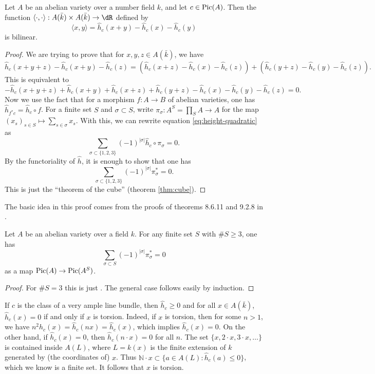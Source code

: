 \begin{lemma}\label{lem:height-quadratic}
Let $A$ be an abelian variety over a number field $k$, and let $c\in \operatorname{Pic}(A)$. 
Then the function 
$\langle \cdot,\cdot\rangle:A(\bar k)\times A(\bar k)\to \dR$ defined by 
\[
  \langle x,y\rangle = \widehat h_c(x+y)-\widehat h_c(x)-\widehat h_c(y)
\]
is bilinear. 
\end{lemma}
\begin{proof}
We are trying to prove that for $x,y,z\in A(\bar k)$, we have 
\[
  \widehat h_c(x+y+z)-\widehat h_c(x+y)-\widehat h_c(z) = \left(\widehat h_c(x+z)-\widehat h_c(x)-\widehat h_c(z)\right) + \left(\widehat h_c(y+z)-\widehat h_c(y)-\widehat h_c(z)\right) \text{.}
\]
This is equivalent to 
\begin{equation}\label{eq:height-quadratic}
  -\widehat h_c(x+y+z)+\widehat h_c(x+y)+\widehat h_c(x+z)+\widehat h_c(y+z)-\widehat h_c(x)-\widehat h_c(y)-\widehat h_c(z) = 0 \text{.}
\end{equation}
Now we use the fact that for a morphism $f:A\to B$ of abelian varieties, one has 
$\widehat h_{f^\ast c}=\widehat h_c\circ f$. For a finite set $S$ and 
$\sigma\subset S$, write $\pi_\sigma:A^S=\prod_S A\to A$ for the map 
$(x_s)_{s\in S}\mapsto \sum_{s\in\sigma} x_s$. With this, we can rewrite 
equation \eqref{eq:height-quadratic} as 
\[
  \sum_{\sigma\subset \{1,2,3\}} (-1)^{|\sigma|}\widehat h_c\circ \pi_\sigma = 0 \text{.}
\]
By the functoriality of $\widehat h$, it is enough to show that one has 
\[
  \sum_{\sigma\subset \{1,2,3\}} (-1)^{|\sigma|} \pi_\sigma^\ast = 0 \text{.}
\]
This is just the ``theorem of the cube'' (theorem \ref{thm:cube}). 
\end{proof}

The basic idea in this proof comes from the proofs of theorems 8.6.11 and 
9.2.8 in \cite{bg06}. 

\begin{theorem}\label{thm:cube}
Let $A$ be an abelian variety over a field $k$. For any finite set $S$ with 
$\# S\geqslant 3$, one has 
\[
  \sum_{\sigma\subset S} (-1)^{|\sigma|} \pi_\sigma^\ast = 0
\]
as a map $\operatorname{Pic}(A)\to \operatorname{Pic}(A^S)$. 
\end{theorem}
\begin{proof}
For $\# S=3$ this is just \cite[2.7]{gm13}. %
The general case follows easily by induction. 
\end{proof}



If $c$ is the class of a very ample line bundle, then 
$\widehat h_c\geqslant 0$ and for all $x\in A(\bar k)$, 
$\widehat h_c(x)=0$ if and only if $x$ is torsion. 
Indeed, if $x$ is torsion, then for some $n>1$, we have 
$n^2 \widehat h_c(x)=\widehat h_c(n x)=\widehat h_c(x)$, which implies 
$\widehat h_c(x)=0$. On the other hand, if $\widehat h_c(x)=0$, then 
$\widehat h_c(n\cdot x)=0$ for all $n$. The set 
$\{x,2\cdot x,3\cdot x,\dots\}$ is contained inside $A(L)$, where $L=k(x)$ is 
the finite extension of $k$ generated by (the coordinates of) $x$. Thus 
$\mathbb{N}\cdot x\subset \{a\in A(L):\widehat h_c(a)\leqslant 0\}$, which we 
know is a finite set. It follows that $x$ is torsion. 

